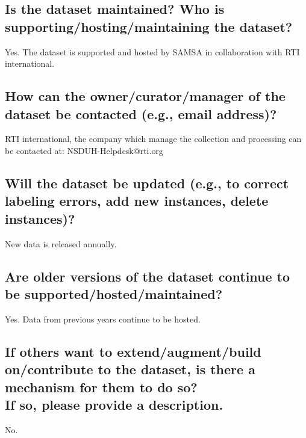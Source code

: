 \documentclass[letterpaper, 10 pt, conference]{ieeeconf}  %
\newcommand{\subtitle}[1]{{\\ \small \normalfont \color{purple} #1}}
\begin{document}
\subsection{Is the dataset maintained? Who is supporting/hosting/maintaining the dataset?}

Yes. The dataset is supported and hosted by SAMSA in collaboration with RTI international.

\subsection{How can the owner/curator/manager of the dataset be contacted (e.g., email address)?}

RTI international, the company which manage the collection and processing can be contacted at: NSDUH-Helpdesk@rti.org

\subsection{Will the dataset be updated (e.g., to correct labeling errors, add new instances, delete instances)?}

New data is released annually.

\subsection{Are older versions of the dataset continue to be supported/hosted/maintained?}

Yes. Data from previous years continue to be hosted.

\subsection{If others want to extend/augment/build on/contribute to the dataset, is there a mechanism for them to do so? \subtitle{If so, please provide a description.}}

No.

\medskip
 
  

\end{document}
